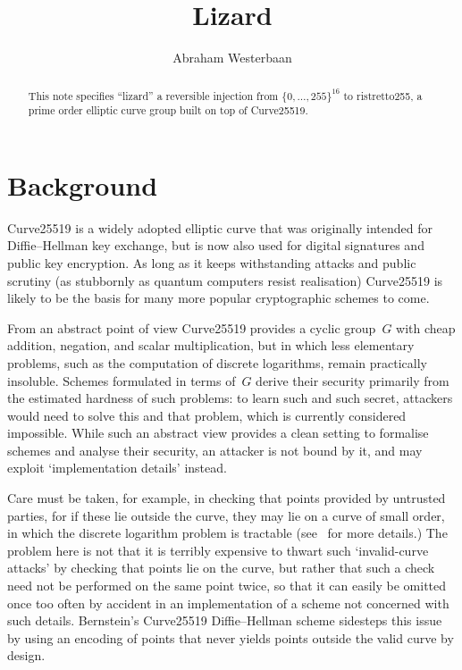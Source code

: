 \documentclass{amsproc}
\title{Lizard}
\author{Abraham Westerbaan}
\begin{document}
\maketitle
\begin{abstract}
This note specifies
``lizard''
a reversible injection from $\{0,\dotsc,255\}^{16}$
to ristretto255, a prime order elliptic curve group built 
    on top of Curve25519.
\end{abstract}

\section{Background}
Curve25519 is a widely adopted elliptic curve
that was originally intended\cite{x25519} for 
Diffie--Hellman key exchange,
but is now also used for
digital signatures\cite{ed25519}
and public key encryption\cite{rfc6637}.
As long as it keeps withstanding attacks and public scrutiny
(as stubbornly as quantum computers resist realisation)
Curve25519 is likely to be the basis for many more popular
cryptographic schemes to come.

From an abstract point of view
Curve25519 provides a cyclic group~$G$
with cheap addition, negation, and scalar multiplication,
but in which less elementary problems, 
such as the computation of discrete logarithms,
remain practically insoluble.
Schemes formulated in terms of~$G$
derive their security primarily from 
the estimated hardness of such problems:
to learn such and such secret,
attackers would
need to solve
this and that problem,
which is currently considered impossible.
While such an abstract view
provides a clean setting 
to formalise schemes
and analyse their security,
an attacker is not bound by it,
and may exploit `implementation details' instead.

Care must be taken,
for example,
in checking that points provided by untrusted parties,
for if these lie outside the curve,
they may lie on a curve of small order,
in which the discrete logarithm problem is tractable
(see~\cite{invalidcurveattack,hmqvattack} for more details.)
The problem here is not that it
is terribly expensive to thwart such 
`invalid-curve attacks'
by checking that points lie on the curve,
but rather that such a check need not be performed on the same point twice,
so that it can easily be omitted once too often by accident
in an implementation of a scheme not concerned with such details.
Bernstein's Curve25519 Diffie--Hellman scheme sidesteps
this issue by using an encoding of points
that never yields points outside the valid curve
by design.
\end{document}
